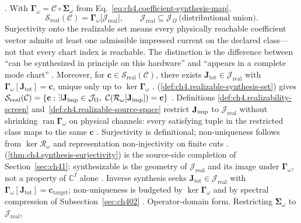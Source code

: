 \cite{harrington2001}.
\label{thm:ch4.synthesis-surjectivity}
With \(\boldsymbol{\Gamma}_\omega=\mathcal{C}\circ\boldsymbol{\Sigma}_\omega\) from
Eq.~\eqref{eq:ch4.coefficient-synthesis-map},
\begin{equation}
\label{eq:ch4.synthesis-surjectivity}
\mathcal{S}_{\mathrm{real}}(\mathcal{C})
=
\boldsymbol{\Gamma}_\omega\big[\mathcal{J}_{\mathrm{real}}\big],
\qquad
\mathcal{J}_{\mathrm{real}}\subseteq\mathcal{J}_\Omega\ \text{(distributional union)}.
\end{equation}
Surjectivity onto the realizable set means every physically reachable coefficient vector admits at least one admissible impressed current on the declared class---not that every chart index is reachable. The distinction is the difference between ``can be synthesized in principle on this hardware'' and ``appears in a complete mode chart'' \cite{devaney2004}.
Moreover, for \(\mathbf{c}\in\mathcal{S}_{\mathrm{real}}(\mathcal{C})\), there exists
\(\mathbf{J}_{\mathrm{tot}}\in\mathcal{J}_{\mathrm{real}}\) with
\(\boldsymbol{\Gamma}_\omega[\mathbf{J}_{\mathrm{tot}}]=\mathbf{c}\), unique only up to
\(\ker\boldsymbol{\Gamma}_\omega\) \cite{stratton1941}.
(\ref{def:ch4.realizable-synthesis-set}) gives
\(\mathcal{S}_{\mathrm{real}}(\mathcal{C})=\{\mathbf{c}:\exists\mathbf{J}_{\mathrm{imp}}\in\mathcal{J}_\Omega,\
\mathcal{C}(\mathcal{R}_\omega[\mathbf{J}_{\mathrm{imp}}])=\mathbf{c}\}\) \cite{stratton1941}. Definitions
\ref{def:ch4.realizability-screen} and~\ref{def:ch4.realizable-source-space} restrict \(\mathbf{J}_{\mathrm{imp}}\) to
\(\mathcal{J}_{\mathrm{real}}\) without shrinking \(\operatorname{ran}\boldsymbol{\Gamma}_\omega\) on
physical channels: every satisfying tuple in the restricted class maps to the same \(\mathbf{c}\)
\cite{harrington2001}. Surjectivity is definitional; non-uniqueness follows from
\(\ker\mathcal{R}_\omega\) and representation non-injectivity on finite cuts
\cite{stratton1941}.
(\ref{thm:ch4.synthesis-surjectivity}) is the source-side completion of Section~\ref{sec:ch41}: synthesizable
is the geometry of \(\mathcal{J}_{\mathrm{real}}\) and its image under \(\boldsymbol{\Gamma}_\omega\), not a
property of \(\mathbb{C}^{I}\) alone \cite{hansen1988}. Inverse synthesis seeks
\(\mathbf{J}_{\mathrm{tot}}\in\mathcal{J}_{\mathrm{real}}\) with
\(\boldsymbol{\Gamma}_\omega[\mathbf{J}_{\mathrm{tot}}]=\mathbf{c}_{\mathrm{target}}\); non-uniqueness is
budgeted by \(\ker\boldsymbol{\Gamma}_\omega\) and by spectral compression of Subsection~\ref{sec:ch402}
\cite{devaney2004}.
Operator-domain form. Restricting \(\boldsymbol{\Sigma}_\omega\) to \(\mathcal{J}_{\mathrm{real}}\),

